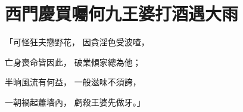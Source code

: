 %

\chapter{西門慶買囑何九\KG 王婆打酒遇大雨}

\begin{showcontents}{}



「可怪狂夫戀野花，  因貪淫色受波喳，

亡身喪命皆因此，  破業傾家總為他；

半晌風流有何益，  一般滋味不須誇，

一朝禍起蕭墻內，  虧殺王婆先做牙。」


\end{showcontents}
